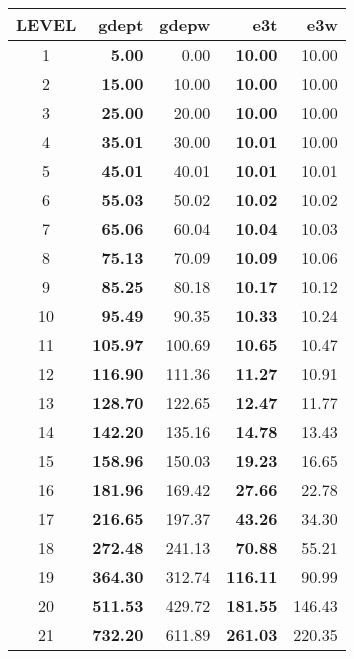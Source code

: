 \documentclass[NEMO_book]{subfiles}
\begin{document}
\begin{table}     \begin{center} \begin{tabular}{c||r|r|r|r}
\hline
\textbf{LEVEL}& \textbf{gdept}& \textbf{gdepw}& \textbf{e3t }& \textbf{e3w  } \\ \hline
1	&	\textbf{  5.00}	&       0.00 &	\textbf{ 10.00} &	 10.00 \\	\hline
2	&	\textbf{15.00}	& 	  10.00 &	\textbf{ 10.00} &	 10.00 \\	\hline
3	&	\textbf{25.00}	&	  20.00 &	\textbf{ 10.00} & 	 10.00 \\	\hline
4	&	\textbf{35.01}	&	  30.00 & 	\textbf{ 10.01} & 	 10.00 \\	\hline
5	&	\textbf{45.01}	&	  40.01 &	\textbf{ 10.01} &	 10.01 \\	\hline
6	&	\textbf{55.03}	&	  50.02 &	\textbf{ 10.02} & 	 10.02 \\	\hline
7	&	\textbf{65.06}	&	  60.04 &	\textbf{ 10.04} &	 10.03 \\	\hline
8	&	\textbf{75.13}	&	  70.09 &	\textbf{ 10.09} &	 10.06 \\	\hline
9	&	\textbf{85.25}	&	  80.18 &	\textbf{ 10.17} &	 10.12 \\	\hline
10	& 	\textbf{95.49}	& 	  90.35 &	\textbf{ 10.33} &	 10.24 \\	\hline
11	& 	\textbf{105.97}	& 	 100.69 &	\textbf{ 10.65} &	 10.47 \\	\hline
12	& 	\textbf{116.90}	& 	 111.36 &	\textbf{ 11.27} &	 10.91 \\	\hline
13	& 	\textbf{128.70}	& 	 122.65 &	\textbf{ 12.47} &	 11.77 \\	\hline
14	& 	\textbf{142.20}	& 	 135.16 &	\textbf{ 14.78} &	 13.43 \\	\hline
15	& 	\textbf{158.96}	& 	 150.03 &	\textbf{ 19.23} &	 16.65 \\	\hline
16	& 	\textbf{181.96}	& 	 169.42 &	\textbf{ 27.66} &	 22.78 \\	\hline
17	& 	\textbf{216.65}	& 	 197.37 & 	\textbf{ 43.26} &	 34.30 \\ \hline
18	& 	\textbf{272.48}	& 	 241.13 & 	\textbf{ 70.88} &	 55.21 \\ \hline
19	& 	\textbf{364.30}	& 	 312.74 & 	\textbf{116.11} &	 90.99 \\ \hline
20	& 	\textbf{511.53}	& 	 429.72 & 	\textbf{181.55} & 	146.43 \\ \hline
21	& 	\textbf{732.20}	& 	 611.89 & 	\textbf{261.03} & 	220.35 \\ \hline

\end{tabular}
\end{center}
\end{table}
\end{document}
